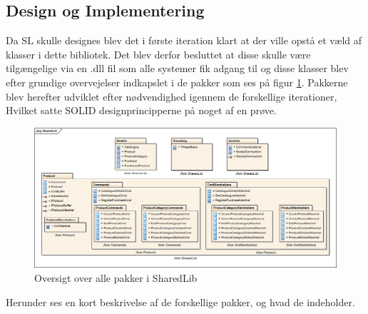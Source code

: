 \subsection{Design og Implementering}

Da \gls{SL} skulle designes blev det i første iteration klart at der ville opstå et væld af klasser i dette bibliotek. Det blev derfor besluttet at disse skulle være tilgængelige via en .dll fil som alle systemer fik adgang til og disse klasser blev efter grundige overvejelser indkapslet i de pakker som ses på figur \ref{fig:oversigtSL}. Pakkerne blev herefter udviklet efter nødvendighed igennem de forskellige iterationer, Hvilket satte SOLID designprincipperne på noget af en prøve.

\begin{figure}[!h]
    \centering
    \includegraphics[width=1.0\textwidth]{Systemdesign/SharedLib/Images/SharedLib_Package.png}
    \caption{Oversigt over alle pakker i SharedLib}
    \label{fig:oversigtSL}
\end{figure}

Herunder ses en kort beskrivelse af de forskellige pakker, og hvad de indeholder.


